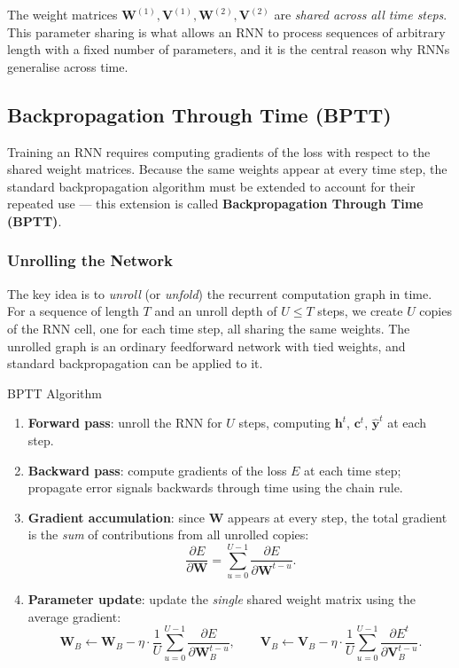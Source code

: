 \documentclass[11pt,a4paper]{article}
\newcommand{\term}[1]{\textcolor{DefGreen}{\textbf{#1}}\index{#1}}
\begin{document}
\begin{notebox}
The weight matrices $\mathbf{W}^{(1)}, \mathbf{V}^{(1)}, \mathbf{W}^{(2)}, \mathbf{V}^{(2)}$ are \emph{shared across all time steps}. This parameter sharing is what allows an RNN to process sequences of arbitrary length with a fixed number of parameters, and it is the central reason why RNNs generalise across time.
\end{notebox}

\subsection{Backpropagation Through Time (BPTT)}
\label{sec:bptt}

Training an RNN requires computing gradients of the loss with respect to the shared weight matrices. Because the same weights appear at every time step, the standard backpropagation algorithm must be extended to account for their repeated use — this extension is called \term{Backpropagation Through Time (BPTT)}.

\subsubsection{Unrolling the Network}

The key idea is to \emph{unroll} (or \emph{unfold}) the recurrent computation graph in time. For a sequence of length $T$ and an unroll depth of $U \leq T$ steps, we create $U$ copies of the RNN cell, one for each time step, all sharing the same weights. The unrolled graph is an ordinary feedforward network with tied weights, and standard backpropagation can be applied to it.

\begin{algobox}{BPTT Algorithm}
\begin{enumerate}
  \item \textbf{Forward pass}: unroll the RNN for $U$ steps, computing $\mathbf{h}^t$, $\mathbf{c}^t$, $\hat{\mathbf{y}}^t$ at each step.
  \item \textbf{Backward pass}: compute gradients of the loss $E$ at each time step; propagate error signals backwards through time using the chain rule.
  \item \textbf{Gradient accumulation}: since $\mathbf{W}$ appears at every step, the total gradient is the \emph{sum} of contributions from all unrolled copies:
  \[
    \frac{\partial E}{\partial \mathbf{W}} = \sum_{u=0}^{U-1} \frac{\partial E}{\partial \mathbf{W}^{t-u}}.
  \]
  \item \textbf{Parameter update}: update the \emph{single} shared weight matrix using the average gradient:
  \[
    \mathbf{W}_B \leftarrow \mathbf{W}_B - \eta \cdot \frac{1}{U}\sum_{u=0}^{U-1}\frac{\partial E}{\partial \mathbf{W}_B^{t-u}},
    \qquad
    \mathbf{V}_B \leftarrow \mathbf{V}_B - \eta \cdot \frac{1}{U}\sum_{u=0}^{U-1}\frac{\partial E^t}{\partial \mathbf{V}_B^{t-u}}.
  \]
\end{enumerate}
\end{algobox}
\end{document}
